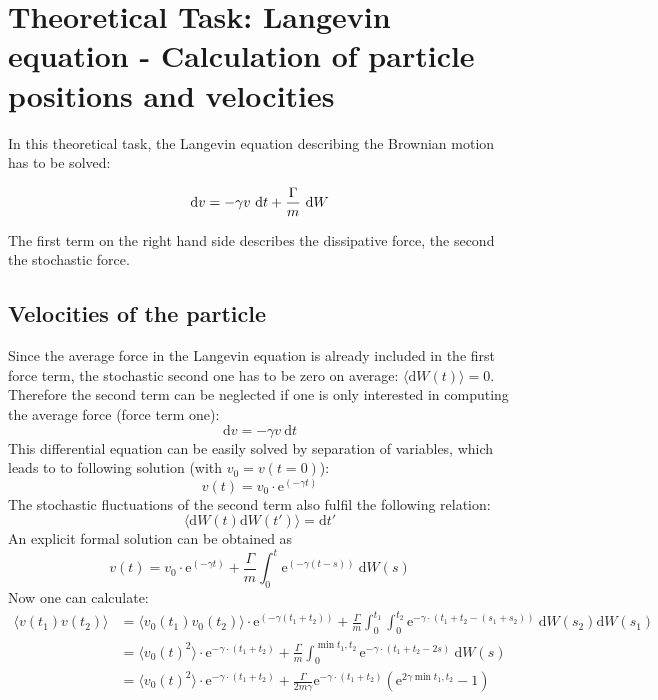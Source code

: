 \documentclass[12pt,a4paper]{scrartcl}
\begin{document}
\section{Theoretical Task: Langevin equation - Calculation of particle
positions and velocities}
In this theoretical task, the Langevin equation describing the Brownian motion has to be solved:

\begin{equation}
	\text{d}v = - \gamma v \text ~ \text{d}t + \frac{\Gamma}{m}~\text{d}W
\end{equation}

The first term on the right hand side describes the dissipative force, the second the stochastic force.

\subsection{Velocities of the particle}
Since the average force in the Langevin equation is already included in the first force term, the stochastic second one has to be zero on average: $\langle \text{d}W(t) \rangle = 0$. Therefore the second term can be neglected if one is only interested in computing the average force (force term one):
\begin{equation}
	\text{d} v = - \gamma v ~ \text{d} t
\end{equation}
This differential equation can be easily solved by separation of variables, which leads to to following solution (with $v_0 = v(t=0)$):
\begin{equation} 
	v(t) = v_0 \cdot \text{e}^{(-\gamma t)}
\end{equation}
The stochastic fluctuations of the second term also fulfil the following relation:
\begin{equation}
	\langle\text{d}W(t)\text{d}W(t')\rangle = \text{d}t'
\end{equation}
An explicit formal solution can be obtained as
\begin{equation}
	v(t) = v_0 \cdot \text{e}^{(-\gamma t)} + \frac{\Gamma}{m} \int_0^t \text{e}^ {(-\gamma(t-s))}~\text{d}W(s)
\end{equation}
Now one can calculate:
\begin{align}
	\langle v(t_1)v(t_2) \rangle &= \langle v_0(t_1) v_0(t_2)\rangle \cdot \text{e}^{(-\gamma (t_1+t_2))}
 + \frac{\Gamma}{m} \int_0^{t_1} \int_0^{t_2} \text{e}^ {-\gamma\cdot(t_1+t_2-(s_1+s_2))}~\text{d}W(s_2)\text{d}W(s_1)\\
	&= \langle v_0(t)^2\rangle \cdot \text{e}^{-\gamma\cdot (t_1+t_2)}	
	 + \frac{\Gamma}{m} \int_0^{\min{t_1, t_2}} \text{e}^ {-\gamma\cdot(t_1+t_2-2s)}~\text{d}W(s)\\
	&= \langle v_0(t)^2\rangle \cdot \text{e}^{-\gamma\cdot (t_1+t_2)}+ \frac{\Gamma}{2 m\gamma} \text{e}^ {-\gamma\cdot(t_1+t_2)}\left( \text{e}^ {2\gamma \min{t_1, t_2}} - 1 \right)
\end{align}
\end{document}
